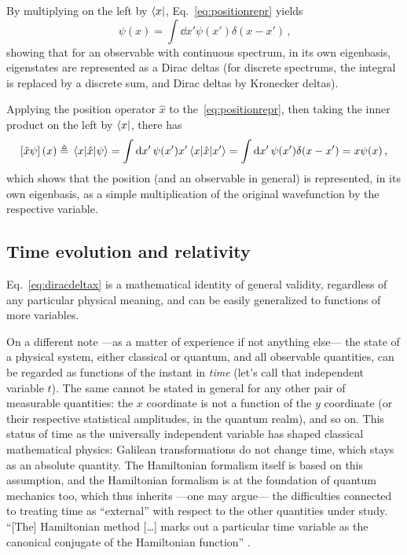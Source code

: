 By multiplying on the left by $\bra{x}$, Eq.~\eqref{eq:positionrepr} yields
\begin{equation}\label{eq:diracdeltax}
  \psi(x) = \int \dd{x'} \psi(x') \delta(x-x') \,\text{,}
\end{equation}
showing that for an observable with continuous spectrum,
in its own eigenbasis, eigenstates are represented as a Dirac deltas
(for discrete spectrums, the integral is replaced by a discrete sum,
and Dirac deltas by Kronecker deltas).

Applying the position operator $\hat{x}$ to the~\eqref{eq:positionrepr},
then taking the inner product on the left by $\bra{x}$,
there has
\begin{equation}
  \qty[\hat{x}\psi](x) \triangleq \mel{x}{\hat{x}}{\psi} =
    \int \dd{x'} \psi(x') x' \mel{x}{\hat{x}}{x'} =
    \int \dd{x'} \psi(x') \delta(x-x') =
    x\psi(x)
  \,\text{,}
\end{equation}
which
shows that the position
(and an observable in general) is represented, in its own eigenbasis,
as a simple multiplication of the original wavefunction by the respective variable.

\subsection{Time evolution and relativity}

Eq.~\eqref{eq:diracdeltax} is a mathematical identity
of general validity,
regardless of any particular physical meaning,
and can be easily generalized to functions
of more variables.

On a different note
---as a matter of experience if not anything else---
the state of a physical system, either classical or quantum,
and all observable quantities,
can be regarded as functions of the instant in \emph{time}
(let's call that independent variable $t$).
The same cannot be stated in general for any other pair of measurable quantities:
the $x$ coordinate is not a function of the $y$ coordinate
(or their respective statistical amplitudes, in the quantum realm),
and so on.
This status of time as the universally independent variable
has shaped classical mathematical physics: Galilean transformations
do not change time, which stays as an absolute quantity.
The Hamiltonian formalism itself is based on this assumption,
and the Hamiltonian formalism is at the foundation of quantum mechanics too,
which thus inherits ---one may argue--- the difficulties connected to
treating time as ``external'' with respect to the other quantities under study.
``[The] Hamiltonian method [\dots] marks out a particular time variable
as the canonical conjugate of the Hamiltonian function'' \parencite{DiracLagrangian}.

